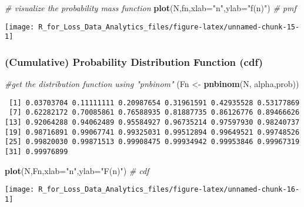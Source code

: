 \documentclass[]{book}
\newenvironment{Shaded}{\begin{snugshade}}{\end{snugshade}}
\newcommand{\KeywordTok}[1]{\textcolor[rgb]{0.13,0.29,0.53}{\textbf{#1}}}
\newcommand{\DataTypeTok}[1]{\textcolor[rgb]{0.13,0.29,0.53}{#1}}
\newcommand{\StringTok}[1]{\textcolor[rgb]{0.31,0.60,0.02}{#1}}
\newcommand{\CommentTok}[1]{\textcolor[rgb]{0.56,0.35,0.01}{\textit{#1}}}
\newcommand{\NormalTok}[1]{#1}
\theoremstyle{definition}
\theoremstyle{definition}
\theoremstyle{definition}
\theoremstyle{remark}
\begin{document}
\begin{Shaded}
\begin{Highlighting}[]
\CommentTok{# visualize the probability mass function}
\KeywordTok{plot}\NormalTok{(N,fn,}\DataTypeTok{xlab=}\StringTok{"n"}\NormalTok{,}\DataTypeTok{ylab=}\StringTok{"f(n)"}\NormalTok{) }\CommentTok{# pmf}
\end{Highlighting}
\end{Shaded}

\begin{center}\texttt{[image: R\_for\_Loss\_Data\_Analytics\_files/figure-latex/unnamed-chunk-15-1]} \end{center}

\subsubsection{(Cumulative) Probability Distribution Function
(cdf)}\label{cumulative-probability-distribution-function-cdf-1}

\begin{Shaded}
\begin{Highlighting}[]
\CommentTok{#get the distribution function using "pnbinom"}
\NormalTok{(Fn <-}\StringTok{ }\KeywordTok{pnbinom}\NormalTok{(N, alpha,prob))}
\end{Highlighting}
\end{Shaded}

\begin{verbatim}
 [1] 0.03703704 0.11111111 0.20987654 0.31961591 0.42935528 0.53177869
 [7] 0.62282172 0.70085861 0.76588935 0.81887735 0.86126776 0.89466626
[13] 0.92064288 0.94062489 0.95584927 0.96735214 0.97597930 0.98240737
[19] 0.98716891 0.99067741 0.99325031 0.99512894 0.99649521 0.99748526
[25] 0.99820030 0.99871513 0.99908475 0.99934942 0.99953846 0.99967319
[31] 0.99976899
\end{verbatim}

\begin{Shaded}
\begin{Highlighting}[]
\KeywordTok{plot}\NormalTok{(N,Fn,}\DataTypeTok{xlab=}\StringTok{"n"}\NormalTok{,}\DataTypeTok{ylab=}\StringTok{"F(n)"}\NormalTok{) }\CommentTok{# cdf}
\end{Highlighting}
\end{Shaded}

\begin{center}\texttt{[image: R\_for\_Loss\_Data\_Analytics\_files/figure-latex/unnamed-chunk-16-1]} \end{center}
\end{document}
